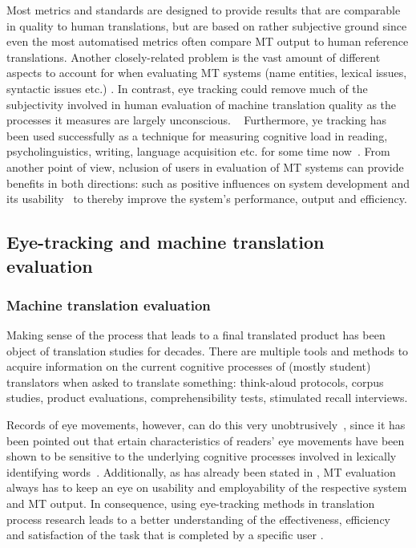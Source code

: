 \documentclass[output=paper,colorlinks,citecolor=brown]{langscibook}
\begin{document}
    Most metrics and standards are designed to provide results that are comparable in quality to human translations, but are based on rather subjective ground since even the most automatised metrics often compare MT output to human reference translations. Another closely-related problem is the vast amount of different aspects to account for when evaluating MT systems (name entities, lexical issues, syntactic issues etc.) \citep[2f.]{han_machine_2018}. In contrast, \glqq eye tracking could remove much of the subjectivity involved in human evaluation of machine translation quality as the processes it measures are largely unconscious. \grqq~\citep[cf.][12]{doherty_eye_2010} Furthermore, \glqq [e]ye tracking has been used successfully as a technique for measuring cognitive load in reading, psycholinguistics, writing, language acquisition etc. for some time now\grqq~\citep[cf.][12] {doherty_eye_2010}. From another point of view, \glqq [i]nclusion of users in evaluation of MT systems can provide benefits in both directions: such as positive influences on system development and its usability\grqq~\citep[4]{doherty_assessing_2014} to thereby improve the system's performance, output and efficiency.

    
    
    \subsection{Eye-tracking and machine translation evaluation}
    \label{subsec:eyetracking-translation}
   
   \subsubsection{Machine translation evaluation}
   \label{subsubsec:mt-evaluation}
   
   Making sense of the process that leads to a final translated product has been object of translation studies for decades. There are multiple tools and methods to acquire information on the current cognitive processes of (mostly student) translators when asked to translate something: think-aloud protocols, corpus studies, product evaluations, comprehensibility tests, stimulated recall interviews.
   
   \glqq Records of eye movements, however, can do this very unobtrusively\grqq~\citep[23]{jakobsen_reading_2017}, since it has been pointed out that \glqq [c]ertain characteristics of readers’ eye movements have been shown to be sensitive to the underlying cognitive processes involved in lexically identifying words\grqq~\citep[23]{jakobsen_reading_2017}. Additionally, as has already been stated in , MT evaluation always has to keep an eye on usability and employability of the respective system and MT output. In consequence, using eye-tracking methods in translation process research leads to a better understanding of the effectiveness, efficiency and satisfaction of the task that is completed by a specific user \citep[cf.][6]{doherty_assessing_2014}.
    
\end{document}
